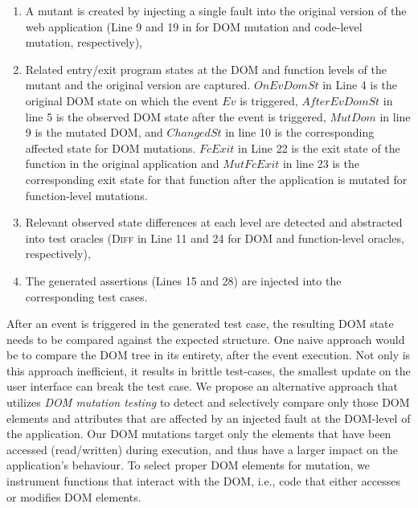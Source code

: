 \begin{enumerate}
\item A mutant is created by injecting a single fault into the original version of the web application (Line 9 and 19 in  for DOM mutation and code-level mutation, respectively), 
\item Related entry/exit program states at the DOM and \javascript function levels of the mutant and the original version are captured. $OnEvDomSt$ in Line 4 is the original DOM state on which the event $Ev$ is triggered, $AfterEvDomSt$ in line 5 is the observed DOM state after the event is triggered, $MutDom$ in line 9 is the mutated DOM, and $ChangedSt$ in line 10 is the corresponding affected state for DOM mutations. $FcExit$ in Line 22 is the exit
state of the function in the original application and $MutFcExit$ in line 23 is the corresponding exit state for that function after the application is mutated for function-level mutations.
\item Relevant observed state differences at each level are detected and abstracted into test oracles (\textsc{Diff} in Line 11 and 24 for DOM and function-level oracles,  respectively),
\item The generated assertions (Lines 15 and 28) are injected into the corresponding test cases. %
\end{enumerate}


 After an event is triggered in the generated \selenium test case, the resulting DOM state needs to be compared against the expected structure. One naive approach would be to compare the DOM tree in its entirety, after the event execution. 
Not only is this approach inefficient, it results in brittle test-cases, \ie the smallest update on the user interface can break the test case. 
We propose an alternative approach that utilizes  \emph{DOM mutation testing} to detect and selectively compare only those DOM elements and attributes that are affected by an injected fault at the DOM-level of the application.
Our DOM mutations target only the elements that have been accessed (read/written) during execution, and thus have a larger impact on the application's behaviour. 
To select proper DOM elements for mutation, we instrument \javascript functions that interact with the DOM, i.e., code that either accesses or modifies  DOM elements. 

